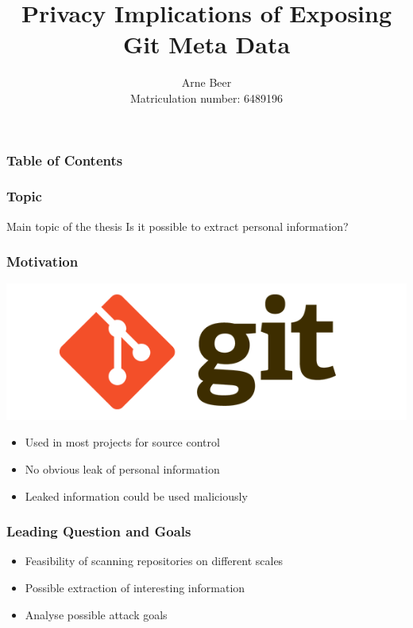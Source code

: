 \documentclass[t]{beamer}
\title[Privacy Implications of Exposing Git Metadata]
{Privacy Implications of Exposing Git Meta Data}
\author[Beer]{Arne Beer \\ \footnotesize Matriculation number: 6489196}
\begin{document}
\begin{frame}[plain]
    \maketitle
\end{frame}

\begin{frame}
    \frametitle{Table of Contents}
	\tableofcontents
\end{frame}

\begin{frame}
    \frametitle{Topic}
    \begin{center}
        \vspace{1cm}
        \begin{block}{Main topic of the thesis}
            Is it possible to extract personal information?
        \end{block}
    \end{center}
\end{frame}

\begin{frame}
    \frametitle{Motivation}
    \vspace{5mm}
    \begin{center}
        \includegraphics[scale=0.15]{./pic/git-logo.png}
    \end{center}
    \begin{itemize}
        \item Used in most projects for source control
        \pause{}
        \item No obvious leak of personal information
        \pause{}
        \item Leaked information could be used maliciously
    \end{itemize}
\end{frame}

\begin{frame}
    \frametitle{Leading Question and Goals}
    \begin{itemize}
        \item Feasibility of scanning repositories on different scales
        \item Possible extraction of interesting information
        \item Analyse possible attack goals
    \end{itemize}
\end{frame}
\end{document}
